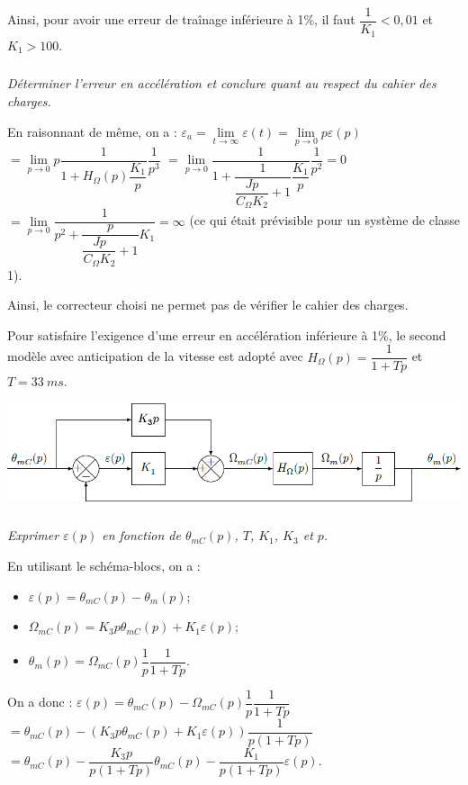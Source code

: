 \documentclass[10pt,fleqn]{article} %
\begin{document}
\begin{multicols}{2}
\begin{corrige}
Ainsi, pour avoir une erreur de traînage inférieure à 1\%, il faut $\dfrac{1}{K_1}<0,01$ et $K_1 >100$.
\end{corrige}
\else
\fi







\subparagraph{}\textit{Déterminer l’erreur en accélération et conclure quant au respect du cahier des charges.}


\ifprof

\begin{corrige}
En raisonnant de même, on a :
 $\varepsilon_a = \lim\limits_{t\to \infty} \varepsilon(t)= \lim\limits_{p\to 0} p\varepsilon(p) $ $= \lim\limits_{p\to 0} p \dfrac{ 1}{ 1+H_{\Omega}(p) \dfrac{K_1}{p}} \dfrac {1}{p^3}$
$= \lim\limits_{p\to 0} \dfrac{ 1}{ 1+\dfrac{1}{\dfrac{Jp}{C_{\Omega} K_2}+1 } \dfrac{K_1}{p}}\dfrac {1}{p^2} = 0$
$= \lim\limits_{p\to 0} \dfrac{ 1}{ p^2+\dfrac{p}{\dfrac{Jp}{C_{\Omega} K_2}+1 } K_1}= \infty$ (ce qui était prévisible pour un système de classe 1).


Ainsi, le correcteur choisi ne permet pas de vérifier le cahier des charges. 
\end{corrige}
\else
\fi

\ifprof
\else
Pour satisfaire l’exigence d’une erreur en accélération inférieure à 1\%, le second modèle avec anticipation de la
vitesse est adopté avec $H_{\Omega}(p)=\dfrac{1}{1+Tp}$ et $T=\SI{33}{ms}$.

\begin{center}
\includegraphics[width=\linewidth]{images/fig_08}
\end{center}
\fi

\subparagraph{}\textit{Exprimer $\varepsilon(p)$ en fonction de $\theta_{mC}(p)$, $T$, $K_1$, $K_3$ et $p$.}
\ifprof

\begin{corrige}
En utilisant le schéma-blocs, on a : 
\begin{itemize}
\item 
$ \varepsilon(p)=\theta_{mC}(p)-\theta_{m}(p)$;
\item  $\Omega_{mC}(p)=K_3 p \theta_{mC}(p) + K_1 \varepsilon(p)$;
\item $\theta_m(p)=\Omega_{mC}(p) \dfrac{1}{p}\dfrac{1}{1+Tp}$. 
\end{itemize}
On a donc : 
$ \varepsilon(p)=\theta_{mC}(p)-\Omega_{mC}(p) \dfrac{1}{p}\dfrac{1}{1+Tp}$ 
$= \theta_{mC}(p)- 
\left(K_3 p \theta_{mC}(p) + K_1 \varepsilon(p)  \right)
\dfrac{1}{p \left( 1+Tp\right)}$
$= \theta_{mC}(p)- 
 \dfrac{K_3 p }{p \left( 1+Tp\right)} \theta_{mC}(p)
-  \dfrac{K_1 }{p \left( 1+Tp\right)} \varepsilon(p)
$. 


\end{corrige}
\end{multicols}
\end{document}
